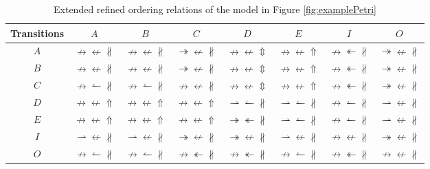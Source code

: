 \documentclass[dvips,...]{llncs}
\begin{document}
\begin{table}[htbp]
\caption{Extended refined ordering relations of the model in Figure \ref{fig:examplePetri}\label{tab:example_relations}}
\centering
	\begin{tabular}{c|c|c|c|c|c|c|c} \hline
		Transitions & $A$ & $B$ & $C$ & $D$ & $E$ & $I$ & $O$\\ \hline
		$A$ 
			& $\nrightarrow\nleftarrow\nparallel$
			& $\nrightarrow\nleftarrow\nparallel$
			& $\twoheadrightarrow\nleftarrow\nparallel$
			& $\nrightarrow\nleftarrow\Updownarrow$
			& $\nrightarrow\nleftarrow\Uparrow$
			& $\nrightarrow\twoheadleftarrow\nparallel$
			& $\twoheadrightarrow\nleftarrow\nparallel$
			\\ \hline
		$B$ 
			& $\nrightarrow\nleftarrow\nparallel$
			& $\nrightarrow\nleftarrow\nparallel$
			& $\twoheadrightarrow\nleftarrow\nparallel$
			& $\nrightarrow\nleftarrow\Updownarrow$
			& $\nrightarrow\nleftarrow\Uparrow$
			& $\nrightarrow\twoheadleftarrow\nparallel$
			& $\twoheadrightarrow\nleftarrow\nparallel$
			\\ \hline
		$C$ 
			& $\nrightarrow\leftharpoonup\nparallel$
			& $\nrightarrow\leftharpoonup\nparallel$
			& $\nrightarrow\nleftarrow\nparallel$
			& $\nrightarrow\nleftarrow\Updownarrow$
			& $\nrightarrow\nleftarrow\Uparrow$
			& $\nrightarrow\twoheadleftarrow\nparallel$
			& $\twoheadrightarrow\nleftarrow\nparallel$
			\\ \hline
		$D$ 
			& $\nrightarrow\nleftarrow\Uparrow$
			& $\nrightarrow\nleftarrow\Uparrow$
			& $\nrightarrow\nleftarrow\Uparrow$
			& $\rightharpoonup\leftharpoonup\nparallel$
			& $\rightharpoonup\leftharpoonup\nparallel$
			& $\nrightarrow\leftharpoonup\nparallel$
			& $\rightharpoonup\nleftarrow\nparallel$
			\\ \hline
		$E$ 
			& $\nrightarrow\nleftarrow\Uparrow$
			& $\nrightarrow\nleftarrow\Uparrow$
			& $\nrightarrow\nleftarrow\Uparrow$
			& $\twoheadrightarrow\twoheadleftarrow\nparallel$
			& $\rightharpoonup\leftharpoonup\nparallel$
			& $\nrightarrow\leftharpoonup\nparallel$
			& $\rightharpoonup\nleftarrow\nparallel$
			\\ \hline
		$I$ 
			& $\rightharpoonup\nleftarrow\nparallel$
			& $\rightharpoonup\nleftarrow\nparallel$
			& $\twoheadrightarrow\nleftarrow\nparallel$
			& $\twoheadrightarrow\nleftarrow\nparallel$
			& $\rightharpoonup\nleftarrow\nparallel$
			& $\nrightarrow\nleftarrow\nparallel$
			& $\twoheadrightarrow\nleftarrow\nparallel$
			\\ \hline
		$O$ 
			& $\nrightarrow\leftharpoonup\nparallel$
			& $\nrightarrow\leftharpoonup\nparallel$
			& $\nrightarrow\twoheadleftarrow\nparallel$
			& $\nrightarrow\twoheadleftarrow\nparallel$
			& $\nrightarrow\leftharpoonup\nparallel$
			& $\nrightarrow\twoheadleftarrow\nparallel$
			& $\nrightarrow\nleftarrow\nparallel$
			\\ \hline
	\end{tabular}
\end{table}
\end{document}

